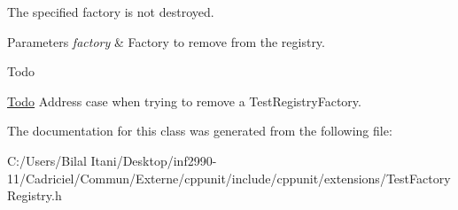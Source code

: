 The specified factory is not destroyed. 
\begin{DoxyParams}{Parameters}
{\em factory} & Factory to remove from the registry. \\
\hline
\end{DoxyParams}
\begin{DoxyRefDesc}{Todo}
\item[\hyperlink{todo__todo000001}{Todo}]Address case when trying to remove a Test\+Registry\+Factory. \end{DoxyRefDesc}


The documentation for this class was generated from the following file\+:\begin{DoxyCompactItemize}
\item 
C\+:/\+Users/\+Bilal Itani/\+Desktop/inf2990-\/11/\+Cadriciel/\+Commun/\+Externe/cppunit/include/cppunit/extensions/Test\+Factory\+Registry.\+h\end{DoxyCompactItemize}
